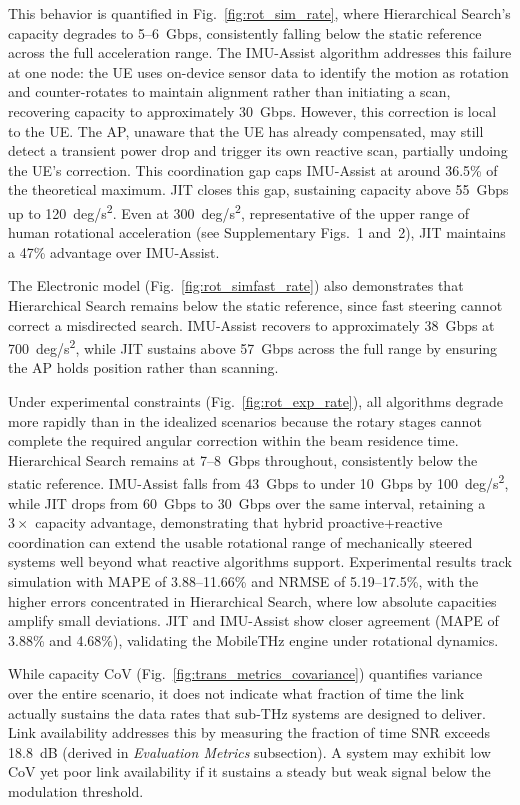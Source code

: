 \documentclass[fleqn,10pt]{wlscirep}
\begin{document}
This behavior is quantified in Fig.~\ref{fig:rot_sim_rate}, where Hierarchical Search's capacity degrades to \SI{5}{}--\SI{6}{Gbps}, consistently falling below the static reference across the full acceleration range. The IMU-Assist algorithm addresses this failure at one node: the UE uses on-device sensor data to identify the motion as rotation and counter-rotates to maintain alignment rather than initiating a scan, recovering capacity to approximately \SI{30}{Gbps}. However, this correction is local to the UE. The AP, unaware that the UE has already compensated, may still detect a transient power drop and trigger its own reactive scan, partially undoing the UE's correction. This coordination gap caps IMU-Assist at around 36.5\% of the theoretical maximum. JIT closes this gap, sustaining capacity above \SI{55}{Gbps} up to \SI{120}{deg/s^2}. Even at \SI{300}{deg/s^2}, representative of the upper range of human rotational acceleration (see Supplementary Figs.~1 and~2), JIT maintains a 47\% advantage over IMU-Assist.

The Electronic model (Fig.~\ref{fig:rot_simfast_rate}) also demonstrates that Hierarchical Search remains below the static reference, since fast steering cannot correct a misdirected search. IMU-Assist recovers to approximately \SI{38}{Gbps} at \SI{700}{deg/s^2}, while JIT sustains above \SI{57}{Gbps} across the full range by ensuring the AP holds position rather than scanning.

Under experimental constraints (Fig.~\ref{fig:rot_exp_rate}), all algorithms degrade more rapidly than in the idealized scenarios because the rotary stages cannot complete the required angular correction within the beam residence time. Hierarchical Search remains at \SI{7}{}--\SI{8}{Gbps} throughout, consistently below the static reference. IMU-Assist falls from \SI{43}{Gbps} to under \SI{10}{Gbps} by \SI{100}{deg/s^2}, while JIT drops from \SI{60}{Gbps} to \SI{30}{Gbps} over the same interval, retaining a $3\times$ capacity advantage, demonstrating that hybrid proactive+reactive coordination can extend the usable rotational range of mechanically steered systems well beyond what reactive algorithms support. Experimental results track simulation with MAPE of 3.88--11.66\% and NRMSE of 5.19--17.5\%, with the higher errors concentrated in Hierarchical Search, where low absolute capacities amplify small deviations. JIT and IMU-Assist show closer agreement (MAPE of 3.88\% and 4.68\%), validating the MobileTHz engine under rotational dynamics.

While capacity CoV (Fig.~\ref{fig:trans_metrics_covariance}) quantifies variance over the entire scenario, it does not indicate what fraction of time the link actually sustains the data rates that sub-THz systems are designed to deliver\cite{Dang2020, Nokia2022}. Link availability addresses this by measuring the fraction of time SNR exceeds \SI{18.8}{dB} (derived in \textit{Evaluation Metrics} subsection). A system may exhibit low CoV yet poor link availability if it sustains a steady but weak signal below the modulation threshold.
\end{document}
